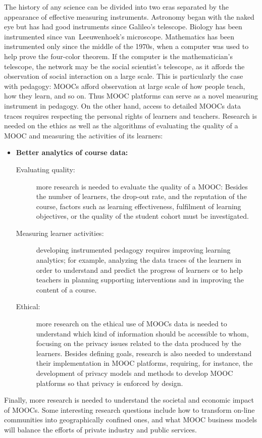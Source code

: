 The history of any science can be divided into two eras separated by the
appearance of effective measuring instruments.
Astronomy began with the naked eye but has had good instruments since
Galileo's telescope.
Biology has been instrumented since van~Leeuwenhoek's microscope.
Mathematics has been instrumented only since the middle of the 1970s,
when a computer was used to help prove the four-color theorem. If the
computer is the mathematician's telescope, the network may be the social
scientist's telescope, as it affords the observation of social
interaction on a large scale. This is particularly the case with
pedagogy: MOOCs afford observation at large scale of how people teach,
how they learn, and so on. Thus MOOC platforms can serve as a novel
measuring instrument in pedagogy. On the other hand, access to detailed
MOOCs data traces requires respecting the personal rights of learners
and teachers.
Research is needed on the ethics as well as the algorithms of
evaluating the quality of a MOOC and measuring the activities of its
learners:

\begin{itemize}
\item \textbf{Better analytics of course data:}
\begin{description}
\item[Evaluating quality:] more research is needed to evaluate the
  quality of a MOOC: Besides the number of learners, the drop-out rate, and the reputation of the course, factors such as learning effectiveness, fulfilment of learning objectives, or the  quality of the student cohort must be investigated.
\item[Measuring learner activities:] developing instrumented pedagogy
  requires improving  learning analytics; for example, analyzing the data traces of the learners in order to understand and predict the  progress of learners or to help teachers in planning supporting interventions and in improving the content of a course.
\item[Ethical:] more research on the ethical use of MOOCs data is needed
  to understand which kind of information should be accessible to whom,
  focusing on the privacy issues related to the data produced by the
  learners. Besides defining goals, research is also needed to
  understand their implementation in MOOC platforms, requiring, for
  instance, the development of privacy models and methods to develop
  MOOC platforms so that privacy is enforced by design.
\end{description}
\end{itemize}

Finally, more research is needed to understand the societal and economic
impact of MOOCs. Some interesting research questions include how
to transform on-line communities into geographically confined
ones, and what MOOC business models will balance the efforts of private industry and
public services. 


